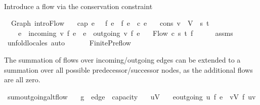 \begin{isabellebody}
\endisatagproof
{\isafoldproof}%
%
\isadelimproof
\ \ \ \ \isanewline
%
\endisadelimproof
\ \ \ \ \isanewline
\ \ \ \ \isanewline
{}\isamarkupfalse%
\ %
%
\begin{isamarkuptext}%
Introduce a flow via the conservation constraint%
\end{isamarkuptext}\isamarkuptrue%
\isamarkupfalse%
\ {\isacharparenleft}\ Graph{\isacharparenright}\ intro{\isacharunderscore}Flow{\isacharcolon}\isanewline
\ \ \ cap{\isacharcolon}\ {\isachardoublequoteopen}{\isasymforall}e{\isachardot}\ {}\ {\isasymle}\ f\ e\ {\isasymand}\ f\ e\ {\isasymle}\ c\ e{\isachardoublequoteclose}\isanewline
\ \ \ cons{\isacharcolon}\ {\isachardoublequoteopen}{\isasymforall}v\ {\isasymin}\ V\ {\isacharminus}\ {\isacharbraceleft}s{\isacharcomma}\ t{\isacharbraceright}{\isachardot}\ \isanewline
\ \ \ \ {\isacharparenleft}{\isasymSum}e\ {\isasymin}\ incoming\ v{\isachardot}\ f\ e{\isacharparenright}\ {\isacharequal}\ {\isacharparenleft}{\isasymSum}e\ {\isasymin}\ outgoing\ v{\isachardot}\ f\ e{\isacharparenright}{\isachardoublequoteclose}\isanewline
\ \ \ {\isachardoublequoteopen}Flow\ c\ s\ t\ f{\isachardoublequoteclose}\ \ \isanewline
%
\isadelimproof
\ \ %
\endisadelimproof
%
\isatagproof
{}\isamarkupfalse%
\ assms\ \isamarkupfalse%
\ unfold{\isacharunderscore}locales\ auto%
\endisatagproof
{\isafoldproof}%
%
\isadelimproof
\ \ \isanewline
%
\endisadelimproof
\ \ \isanewline
{}\isamarkupfalse%
\ Finite{\isacharunderscore}Preflow\ \isanewline
{}%
\begin{isamarkuptext}%
The summation of flows over incoming/outgoing edges can be 
  extended to a summation over all possible predecessor/successor nodes,
  as the additional flows are all zero.%
\end{isamarkuptext}\isamarkuptrue%
\isamarkupfalse%
\ sum{\isacharunderscore}outgoing{\isacharunderscore}alt{\isacharunderscore}flow{\isacharcolon}\isanewline
\ \ \ g\ {\isacharcolon}{\isacharcolon}\ {\isachardoublequoteopen}edge\ {\isasymRightarrow}\ {\isacharprime}capacity{\isachardoublequoteclose}\isanewline
\ \ \ {\isachardoublequoteopen}u{\isasymin}V{\isachardoublequoteclose}\isanewline
\ \ \ {\isachardoublequoteopen}{\isacharparenleft}{\isasymSum}e{\isasymin}outgoing\ u{\isachardot}\ f\ e{\isacharparenright}\ {\isacharequal}\ {\isacharparenleft}{\isasymSum}v{\isasymin}V{\isachardot}\ f\ {\isacharparenleft}u{\isacharcomma}v{\isacharparenright}{\isacharparenright}{\isachardoublequoteclose}\isanewline

\end{isabellebody}
